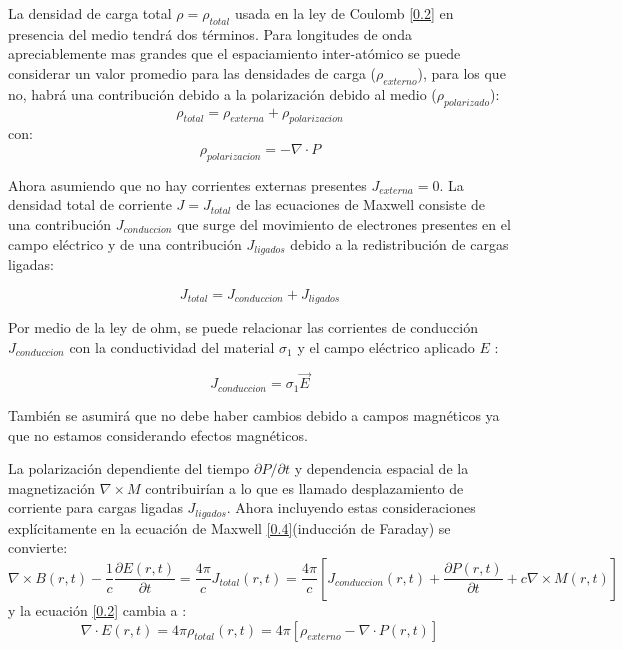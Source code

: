 \documentclass[a4paper,openright,12pt]{book}
\begin{document}
La densidad de carga total $\rho=\rho_{total}$ usada en la ley de Coulomb \ref{0.2} en presencia del medio tendrá dos términos. Para longitudes de onda apreciablemente mas grandes que el espaciamiento inter-atómico se puede considerar un valor promedio para las densidades de carga ($\rho_{externo}$), para los que no, habrá una contribución debido a la polarización debido al medio ($\rho_{polarizado}$):
\begin{equation}
\rho_{total}=\rho_{externa}+\rho_{polarizacion}
\end{equation}
con:
\begin{equation}
\rho_{polarizacion}=-\nabla\cdot P
\end{equation}

Ahora asumiendo que no hay corrientes externas presentes $J_{externa}=0$. La densidad total de corriente $J=J_{total}$ de las ecuaciones de Maxwell consiste de una contribución $J_{conduccion}$ que surge del movimiento de electrones presentes en el campo eléctrico y de una contribución $J_{ligados}$ debido a la redistribución de cargas ligadas:

\begin{equation}
J_{total}=J_{conduccion}+J_{ligados}
\end{equation}

Por medio de la ley de ohm, se puede relacionar las corrientes de conducción $J_{conduccion}$ con la conductividad del material $\sigma_{1}$ y el campo eléctrico aplicado $E$ \cite{electrodynamics}:

\begin{equation}\label{1.7}
J_{conduccion}=\sigma_{1}\vec{E}
\end{equation}

También se asumirá que no debe haber cambios debido a campos magnéticos ya que no estamos considerando efectos magnéticos. 

La polarización dependiente del tiempo $\partial P/\partial t$ y dependencia espacial de la magnetización $\nabla\times M$ contribuirían a lo que es llamado desplazamiento de corriente para cargas ligadas $J_{ligados}$. Ahora incluyendo estas consideraciones explícitamente en la ecuación de Maxwell \ref{0.4}(inducción de Faraday) se convierte:
\begin{equation}
\nabla\times B(r,t)-\frac{1}{c}\frac{\partial E(r,t)}{\partial t}=\frac{4\pi}{c}J_{total}(r,t)=\frac{4\pi}{c}[J_{conduccion}(r,t)+\frac{\partial P(r,t)}{\partial t}+c\nabla \times M(r,t)]
\end{equation}
y la ecuación \ref{0.2} cambia a :
\begin{equation}
\nabla \cdot E(r,t)=4\pi \rho_{total}(r,t)=4\pi[\rho_{externo}-\nabla\cdot P(r,t)]
\end{equation}
\end{document}
